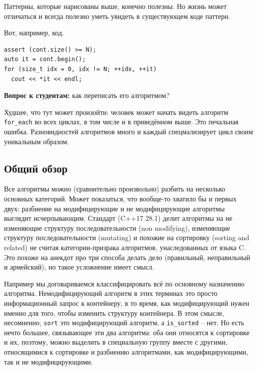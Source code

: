\documentclass[a4paper,12pt,oneside]{book}
\newif\ifanswers
\begin{document}
Паттерны, которые нарисованы выше, конечно полезны. Но жизнь может отличаться и всегда полезно уметь увидеть в существующем коде паттерн.

Вот, например, код.

\begin{lstlisting}
assert (cont.size() >= N);
auto it = cont.begin();
for (size_t idx = 0, idx != N; ++idx, ++it)
  cout << *it << endl;
\end{lstlisting}

\textbf{Вопрос к студентам:} как переписать его алгоритмом?

\ifanswers
Это очевидный случай \lstinline!copy_n! и алгоритм будет соответствующий (здесь \lstinline!tp_! это тип элемента в контейнере).

\begin{lstlisting}
copy_n (cont.begin(), N, ostream_iterator<tp_>(cout, "\n"));
\end{lstlisting}
\fi

Худшее, что тут может произойти: человек может начать видеть алгоритм \lstinline!for_each! во всех циклах, в том числе и в приведённом выше. Это печальная ошибка. Разновидностей алгоритмов много и каждый спецмализирует цикл своим уникальным образом.

\subsection{Общий обзор}

Все алгоритмы можно (сравнительно произвольно) разбить на несколько основных категорий. Может показаться, что вообще-то хватило бы и первых двух: разбиение на модифицирующие и не модифицирующие алгоритмы выглядит исчерпывающим. Стандарт (C++17 28.1) делит алгоритмы на не изменяющие структуру последовательности (non modifying), изменяющие структуру последовательности (mutating) и похожие на сортировку (sorting and related) не считая категории-призрака алгоритмов, унаследованных от языка C. Это похоже на анекдот про три способа делать дело (правильный, неправильный и армейский), но такое усложнение имеет смысл.

Например мы договариваемся классифицировать всё по основному назначению алгоритма. Немодифицирующий алгоритм в этих терминах это просто информационный запрос к контейнеру, в то время, как модифицирующий нужен именно для того, чтобы изменить структуру контейнера. В этом смысле, несомненно, \lstinline!sort! это модифицирующий алгоритм, а \lstinline!is_sorted! -- нет. Но есть нечто большее, связывающее эти два алгоритма: оба они относятся к сортировке и их, поэтому, можно выделить в специальную группу вместе с другими, относящимися к сортировке и разбиению алгоритмами, как модифицирующими, так и не модифицирующими.
\end{document}

